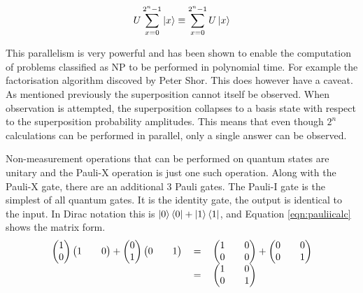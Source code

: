 \begin{equation}
\label{eqn:uequiv}
 U\sum_{x=0}^{2^n-1}\left\vert{x}\right\rangle\equiv{\sum_{x=0}^{2^n-1}U\left\vert{x}\right\rangle}
\end{equation}

This parallelism is very powerful and has been shown to enable the computation of problems classified as NP to be performed in polynomial time.
For example the factorisation algorithm discoved by Peter Shor\cite{Shor:1994jg}.
This does however have a caveat.
As mentioned previously the superposition cannot itself be observed.
When observation is attempted, the superposition collapses to a basis state with respect to the superposition probability amplitudes.
This means that even though $2^n$ calculations can be performed in parallel, only a single answer can be observed.

Non-measurement operations that can be performed on quantum states are unitary and the Pauli-X operation is just one such operation.
Along with the Pauli-X gate, there are an additional 3 Pauli gates.
The Pauli-I gate is the simplest of all quantum gates.
It is the identity gate, the output is identical to the input.
In Dirac notation this is $\left\vert{0}\right\rangle\left\langle{0}\right\vert + \left\vert{1}\right\rangle\left\langle{1}\right\vert$, and Equation \ref{eqn:pauliicalc} shows the matrix form. 
\begin{equation}
\label{eqn:pauliicalc}
\begin{tabular}{ r c l }
\(\begin {pmatrix}
1\\
0
\end{pmatrix}
\begin {pmatrix}
1&&
0
\end{pmatrix}
 + 
\begin {pmatrix}
0\\
1
\end{pmatrix}
\begin {pmatrix}
0&&
1
\end{pmatrix}\)
& \(=\)
& \( 
\begin{pmatrix}
1 && 0 \\
0 && 0
\end{pmatrix}
 + 
\begin{pmatrix}
0 && 0\\
0 && 1
\end{pmatrix}
\) \\
& \(=\)
& \( 
\begin{pmatrix}
1 && 0 \\
0 && 1
\end{pmatrix}
\)
\end{tabular}
\end{equation}

